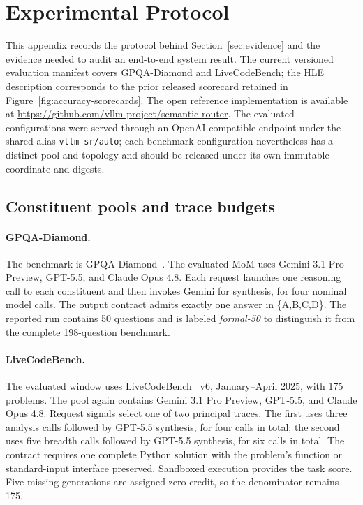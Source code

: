 \section{Experimental Protocol}
\label{app:reproducibility}
\begingroup
\small

This appendix records the protocol behind Section~\ref{sec:evidence} and the
evidence needed to audit an end-to-end system result. The current versioned
evaluation manifest covers GPQA-Diamond and LiveCodeBench; the HLE description
corresponds to the prior released scorecard retained in
Figure~\ref{fig:accuracy-scorecards}. The open reference implementation is available at
\url{https://github.com/vllm-project/semantic-router}. The evaluated
configurations were served through an OpenAI-compatible endpoint under the
shared alias \texttt{vllm-sr/auto}; each benchmark configuration nevertheless
has a distinct pool and topology and should be released under its own immutable
coordinate and digests.

\subsection{Constituent pools and trace budgets}

\paragraph{GPQA-Diamond.}
The benchmark is GPQA-Diamond~\citep{rein_2023_gpqa}.  The evaluated MoM
uses Gemini 3.1 Pro Preview, GPT-5.5, and Claude Opus 4.8.  Each request launches
one reasoning call to each constituent and then invokes Gemini for synthesis,
for four nominal model calls.  The output contract admits exactly one answer in
\{A,B,C,D\}.  The reported run contains 50 questions and is labeled
\emph{formal-50} to distinguish it from the complete 198-question benchmark.

\paragraph{LiveCodeBench.}
The evaluated window uses LiveCodeBench~\citep{jain_2024_livecodebench} v6,
January--April 2025, with 175 problems.  The pool again contains Gemini 3.1 Pro
Preview, GPT-5.5, and Claude Opus 4.8. Request signals select one of two
principal traces. The first uses three analysis calls followed by GPT-5.5
synthesis, for four calls in total; the second uses five breadth calls followed
by GPT-5.5 synthesis, for six calls in total. The contract requires one complete
Python solution with the problem's function or standard-input interface
preserved.  Sandboxed execution provides the task score.  Five missing
generations are assigned zero credit, so the denominator remains 175.

